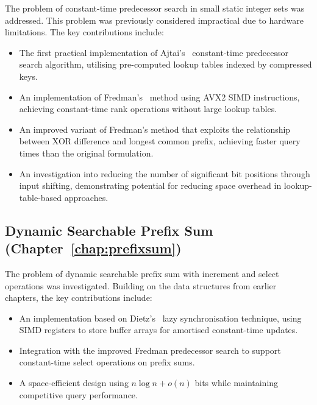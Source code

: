 The problem of constant-time predecessor search in small static integer sets was addressed. This problem was previously considered impractical due to hardware limitations. The key contributions include:

\begin{itemize}
    \item The first practical implementation of Ajtai's~\cite{AJTAI1984217} constant-time predecessor search algorithm, utilising pre-computed lookup tables indexed by compressed keys.

    \item An implementation of Fredman's~\cite{FREDMAN1993424} method using AVX2 SIMD instructions, achieving constant-time rank operations without large lookup tables.

    \item An improved variant of Fredman's method that exploits the relationship between XOR difference and longest common prefix, achieving faster query times than the original formulation.

    \item An investigation into reducing the number of significant bit positions through input shifting, demonstrating potential for reducing space overhead in lookup-table-based approaches.
\end{itemize}

\subsection{Dynamic Searchable Prefix Sum (Chapter~\ref{chap:prefixsum})}

The problem of dynamic searchable prefix sum with increment and select operations was investigated. Building on the data structures from earlier chapters, the key contributions include:

\begin{itemize}
    \item An implementation based on Dietz's~\cite{Dietz_1989} lazy synchronisation technique, using SIMD registers to store buffer arrays for amortised constant-time updates.

    \item Integration with the improved Fredman predecessor search to support constant-time select operations on prefix sums.

    \item A space-efficient design using $n \log n + o(n)$ bits while maintaining competitive query performance.
\end{itemize}

